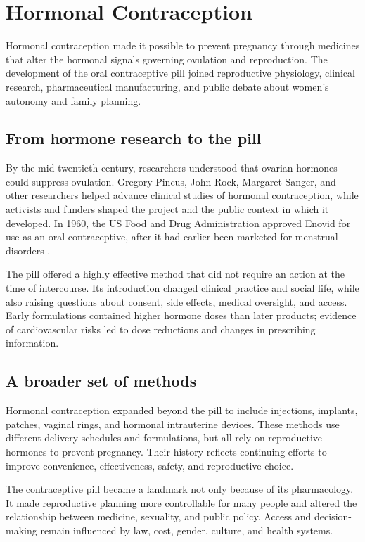 \documentclass[12pt,oneside]{book}
\begin{document}
\chapter[Hormonal Contraception]{Hormonal Contraception}

Hormonal contraception made it possible to prevent pregnancy through medicines
that alter the hormonal signals governing ovulation and reproduction. The
development of the oral contraceptive pill joined reproductive physiology,
clinical research, pharmaceutical manufacturing, and public debate about
women's autonomy and family planning.

\section{From hormone research to the pill}
By the mid-twentieth century, researchers understood that ovarian hormones could suppress ovulation. Gregory Pincus, John Rock, Margaret Sanger, and other researchers helped advance clinical studies of hormonal contraception, while activists and funders shaped the project and the public context in which it developed. In 1960, the US Food and Drug Administration approved Enovid for use as an oral contraceptive, after it had earlier been marketed for menstrual disorders \cite{fdaEnovidHistory}.

The pill offered a highly effective method that did not require an action at
the time of intercourse. Its introduction changed clinical practice and social
life, while also raising questions about consent, side effects, medical
oversight, and access. Early formulations contained higher hormone doses than
later products; evidence of cardiovascular risks led to dose reductions and
changes in prescribing information.

\section{A broader set of methods}
Hormonal contraception expanded beyond the pill to include injections, implants, patches, vaginal rings, and hormonal intrauterine devices. These methods use different delivery schedules and formulations, but all rely on reproductive hormones to prevent pregnancy. Their history reflects continuing efforts to improve convenience, effectiveness, safety, and reproductive choice.

The contraceptive pill became a landmark not only because of its pharmacology.
It made reproductive planning more controllable for many people and altered
the relationship between medicine, sexuality, and public policy. Access and
decision-making remain influenced by law, cost, gender, culture, and health
systems.
\end{document}

